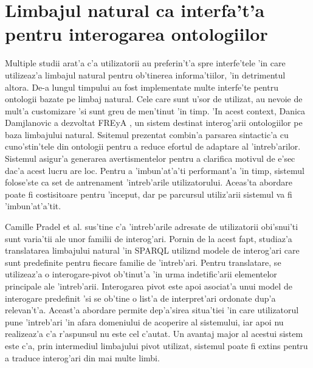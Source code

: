 \documentclass[12pt,a4paper,twoside]{report}
\begin{document}


\section{Limbajul natural ca interfa't'a pentru interogarea ontologiilor}

Multiple studii arat'a c'a utilizatorii au preferin't'a spre interfe'tele 'in care utilizeaz'a limbajul natural pentru ob'tinerea informa'tiilor, 'in detrimentul altora. De-a lungul timpului au fost implementate multe interfe'te pentru ontologii bazate pe limbaj natural. Cele care sunt u'sor de utilizat, au nevoie de mult'a customizare 'si sunt greu de men'tinut 'in timp. 'In acest context, Danica Damjlanovic a dezvoltat FREyA \cite{DamljanovicNaturalInteraction}, un sistem destinat interog'arii ontologiilor pe baza limbajului natural. Ssitemul prezentat combin'a parsarea sintactic'a cu cuno'stin'tele din ontologii pentru a reduce efortul de adaptare al 'intreb'arilor. Sistemul asigur'a generarea avertismentelor pentru a clarifica motivul de e'sec dac'a acest lucru are loc. Pentru a 'imbun'at'a'ti performant'a 'in timp, sistemul folose'ste ca set de antrenament 'intreb'arile utilizatorului. Aceas'ta abordare poate fi costisitoare pentru 'inceput, dar pe parcursul utiliz'arii sistemul va fi 'imbun'at'a'tit. 

Camille Pradel et al. \cite{PradelNaturalPatterns} sus'tine c'a 'intreb'arile adresate de utilizatorii obi'snui'ti sunt varia'tii ale unor familii de interog'ari. Pornin de la acest fapt, studiaz'a translatarea limbajului natural 'in SPARQL utiliz\ia nd modele de interog'ari care sunt predefinite pentru fiecare familie de 'intreb'ari. Pentru translatare, se utilizeaz'a o interogare-pivot ob'tinut'a 'in urma indetific'arii elementelor principale ale 'intreb'arii. Interogarea pivot este apoi asociat'a unui model de interogare predefinit 'si se ob'tine o list'a de interpret'ari ordonate dup'a relevan't'a. Aceast'a abordare permite dep'a'sirea situa'tiei 'in care utilizatorul pune 'intreb'ari 'in afara domeniului de acoperire al sistemului, iar apoi nu realizeaz'a c'a r'aspunsul nu este cel c'autat. Un avantaj major al acestui sistem este c'a, prin intermediul limbajului pivot utilizat, sistemul poate fi extins pentru a traduce interog'ari din mai multe limbi.
\end{document}
